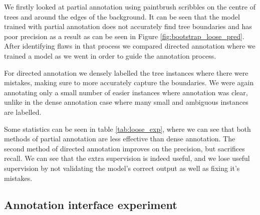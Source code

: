 We firstly looked at partial annotation using paintbrush scribbles on the centre of trees and around the edges of the background. It can be seen that the model trained with partial annotation does not accurately find tree boundaries and has poor precision as a result as can be seen in Figure \ref{fig:bootstrap_loose_pred}. After identifying flaws in that process we compared directed annotation where we trained a model as we went in order to guide the annotation process.

For directed annotation we densely labelled the tree instances where there were mistakes, making sure to more accurately capture the boundaries. We were again annotating only a small number of easier instances where annotation was clear, unlike in the dense annotation case where many small and ambiguous instances are labelled.

Some statistics can be seen in table \ref{tab:loose_exp}, where we can see that both methods of partial annotation are less effective than dense annotation. The second method of directed annotation improves on the precision, but sacrifices recall. We can see that the extra supervision is indeed useful, and we lose useful supervision by not validating the model's correct output as well as fixing it's mistakes.


\begin{table}[!ht]
  \centering
    \caption{Statistics from re-annotation test set}

\noindent{}

\label{tab:loose_exp}
\end{table}






\subsection {Annotation interface experiment}



